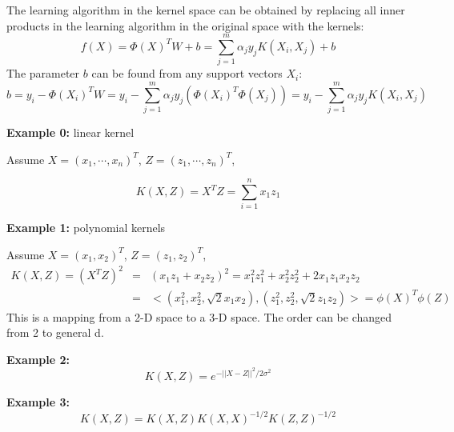 The learning algorithm in the kernel space can be obtained by replacing
all inner products in the learning algorithm in the original space with 
the kernels:
\[ f(X)=\Phi(X)^T W+b=\sum_{j=1}^m \alpha_j y_j K(X_i,X_j)+b	\]
The parameter $b$ can be found from any support vectors $X_i$:
\[ b=y_i-\Phi(X_i)^T W=y_i-\sum_{j=1}^m  \alpha_j y_j 
	(\Phi(X_i)^T \Phi(X_j))=y_i-\sum_{j=1}^m  \alpha_j y_j K(X_i,X_j) \]

{\bf Example 0:} linear kernel

Assume $X=(x_1,\cdots,x_n)^T$, $Z=(z_1,\cdots,z_n)^T$, 

\[	K(X,Z)=X^T Z=\sum_{i=1}^n x_1z_1	\]

{\bf Example 1:} polynomial kernels

Assume $X=(x_1,x_2)^T$, $Z=(z_1,z_2)^T$, 
\begin{eqnarray}
	K(X,Z)=(X^TZ)^2&=&(x_1z_1+x_2z_2)^2=x_1^2z_1^2+x_2^2z_2^2+2x_1z_1x_2z_2
	\nonumber \\
	&=&<(x_1^2,x_2^2,\sqrt{2}x_1x_2),(z_1^2,z_2^2,\sqrt{2}z_1z_2)>
	=\phi(X)^T \phi(Z)
	\nonumber
\end{eqnarray}
This is a mapping from a 2-D space to a 3-D space. The order can be changed 
from 2 to general d.

{\bf Example 2:} 
\[	K(X,Z)=e^{-||X-Z||^2/2\sigma^2}	\]

{\bf Example 3:} 
\[	K(X,Z)=K(X,Z)K(X,X)^{-1/2}K(Z,Z)^{-1/2}	\]




